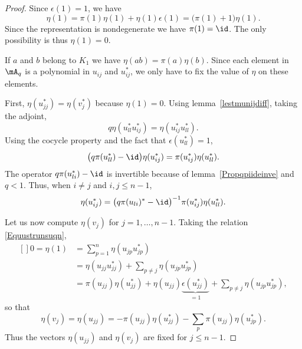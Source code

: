 \begin{proof}
    Since $\epsilon(1)=1$, we have
    \begin{equation}
        \eta(1)=\pi(1)\eta(1)+\eta(1)\epsilon(1)=\big( \pi(1)+1 \big)\eta(1).
    \end{equation}
    Since the representation is nondegenerate we have $\pi(1)=\id$. The only possibility is thus $\eta(1)=0$.

    If $a$ and $b$ belong to $K_1$ we have $\eta(ab)=\pi(a)\eta(b)$. Since each element in $\mA_q$ is a polynomial in $u_{ij}$ and $u_{ij}^*$, we only have to fix the value of $\eta$ on these elements.

    First, $\eta(u_{jj}^*)=\eta(v_j^*)$ because $\eta(1)=0$. Using lemma~\ref{lestmunijdiff}, taking the adjoint,
    \begin{equation}
        q\eta(u_{ll}^*u_{ij}^*)=\eta(u_{ij}^*u_{ll}^*).
    \end{equation}
    Using the cocycle property and the fact that $\epsilon(u_{ll}^*)=1$,
    \begin{equation}
        \big( q\pi(u_{ll}^*)-\id \big)\eta(u_{ij}^*)=\pi(u_{ij}^*)\eta(u_{ll}^*).
    \end{equation}
    The operator $q\pi(u_{li}^*)-\id$ is invertible because of lemma~\ref{Propqpiideinve} and $q<1$. Thus, when $i\neq j$ and $i,j\leq n-1$,
    \begin{equation}
        \eta(u_{ij}^*)=\big( q\pi(u_{li})^*-\id \big)^{-1}\pi(u_{ij}^*)\eta(u_{ll}^*).
    \end{equation}

    Let us now compute $\eta(v_j)$ for $j=1,\ldots,n-1$. Taking the relation \eqref{Equustrunsuqn},
    \begin{equation}
        \begin{aligned}[]
            0=\eta(1)&=\sum_{p=1}^n\eta(u_{jp}u_{jp}^*)\\
            &=\eta(u_{jj}u_{jj}^*)+\sum_{p\neq j}\eta(u_{jp}u_{jp}^*)\\
            &=\pi(u_{jj})\eta(u_{jj}^*)+\eta(u_{jj})\underbrace{\epsilon(u_{jj}^*)}_{=1}+\sum_{p\neq j}\eta(u_{jp}u_{jp}^*),
        \end{aligned}
    \end{equation}
    so that
    \begin{equation}        \label{Eqetaujjpiu}
        \eta(v_j)=\eta(u_{jj})=-\pi(u_{jj})\eta(u_{jj}^*)-\sum_p\pi(u_{jj})\eta(u_{jp}^*).
    \end{equation}
    Thus the vectors $\eta(u_{jj})$ and $\eta(v_j)$ are fixed for $j\leq n-1$.


\end{proof}
